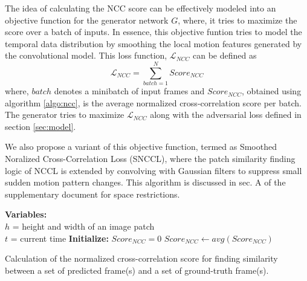 \documentclass{article}
\begin{document}
  The idea of calculating the NCC score can be effectively modeled into an objective function for the generator network $ G $, where, it tries to maximize the score over a batch of inputs. In essence, this objective funtion tries to model the temporal data distribution by smoothing the local motion features generated by the convolutional model. This loss function, $ \mathcal{L}_{NCC} $ can be defined as
  \begin{equation}
  	\mathcal{L}_{NCC} = \sum_{batch = 1}^{N}Score_{NCC}
  	\label{eq:lncc}
  \end{equation}
  where, $ batch $ denotes a minibatch of input frames and $ Score_{NCC} $, obtained using algorithm \ref{algo:ncc}, is the average normalized cross-correlation score per batch. The generator tries to maximize $ \mathcal{L}_{NCC} $ along with the adversarial loss defined in section \ref{sec:model}. 
  
  We also propose a variant of this objective function, termed as Smoothed Noralized Cross-Correlation Loss (SNCCL), where the patch similarity finding logic of NCCL is extended by convolving with Gaussian filters to suppress small sudden motion pattern changes. This algorithm is discussed in sec. A of the supplementary document for space restrictions.  
  
  \begin{algorithm}[!htbp]
  	\SetAlgoLined
  	\textbf{Variables:}\\
  	$ h $ = height and width of an image patch\\
  	$ t $ = current time\;
  	\textbf{Initialize:} $ Score_{NCC} = 0 $\;
  	$ Score_{NCC} \leftarrow avg(Score_{NCC}) $\;
  \caption{Calculation of the normalized cross-correlation score for finding similarity between a set of predicted frame(s) and a set of ground-truth frame(s).}
  \label{algo:ncc}
\end{algorithm}
\end{document}
